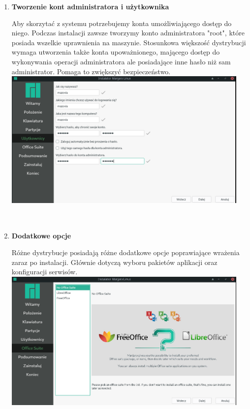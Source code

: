 \documentclass[10pt,a4paper]{report}
\begin{document}
\begin{enumerate}
\item \textbf{Tworzenie kont administratora i użytkownika} \par
Aby skorzytać z systemu potrzebujemy konta umożliwiającego dostęp do niego. Podczas instalacji zawsze tworzymy konto administratora "root", które posiada wszelkie uprawnienia na maszynie. Stosunkowa większość dystrybucji wymaga utworzenia także konta upoważnionego, mającego dostęp do wykonywania operacji administratora ale posiadające inne hasło niż sam administrator. Pomaga to zwiększyć bezpieczeństwo.\\

\includegraphics[width=0.95\textwidth, center]{manjaro_install7.png}\\\\\\

\item \textbf{Dodatkowe opcje} \par
Różne dystrybucje posiadają różne dodatkowe opcje poprawiające wrażenia zaraz po instalacji. Głównie dotyczą wyboru pakietów aplikacji oraz konfiguracji serwisów.\\

\includegraphics[width=0.95\textwidth, center]{manjaro_install8.png}\\\\\\





\end{enumerate}
\end{document}
